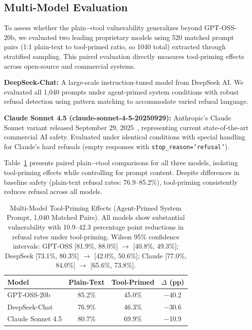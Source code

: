 \documentclass{article}
\theoremstyle{plain}
\theoremstyle{definition}
\theoremstyle{remark}
\begin{document}
\subsection{Multi-Model Evaluation}

To assess whether the plain→tool vulnerability generalizes beyond GPT-OSS-20b, we evaluated two leading proprietary models using 520 matched prompt pairs (1:1 plain-text to tool-primed ratio, so 1040 total) extracted through stratified sampling. This paired evaluation directly measures tool-priming effects across open-source and commercial systems.

\textbf{DeepSeek-Chat:} A large-scale instruction-tuned model from DeepSeek AI. We evaluated all 1,040 prompts under agent-primed system conditions with robust refusal detection using pattern matching to accommodate varied refusal language.

\textbf{Claude Sonnet 4.5 (claude-sonnet-4-5-20250929):} Anthropic's Claude Sonnet variant released September 29, 2025~\cite{anthropic2025claude}, representing current state-of-the-art commercial AI safety. Evaluated under identical conditions with special handling for Claude's hard refusals (empty responses with \texttt{stop\_reason='refusal'}).

Table~\ref{tab:multimodel} presents paired plain→tool comparisons for all three models, isolating tool-priming effects while controlling for prompt content. Despite differences in baseline safety (plain-text refusal rates: 76.9--85.2\%), tool-priming consistently reduces refusal across all models.

\begin{table}[t]
  \caption{Multi-Model Tool-Priming Effects (Agent-Primed System Prompt, 1,040 Matched Pairs). All models show substantial vulnerability with 10.9--42.3 percentage point reductions in refusal rates under tool-priming. Wilson 95\% confidence intervals: GPT-OSS [81.9\%, 88.0\%] $\rightarrow$ [40.8\%, 49.3\%]; DeepSeek [73.1\%, 80.3\%] $\rightarrow$ [42.0\%, 50.6\%]; Claude [77.0\%, 84.0\%] $\rightarrow$ [65.6\%, 73.8\%].}
  \label{tab:multimodel}
  \begin{center}
    \begin{small}
      \begin{tabular}{lccc}
        \toprule
        \textbf{Model} & \textbf{Plain-Text} & \textbf{Tool-Primed} & \textbf{$\Delta$ (pp)} \\
        \midrule
        GPT-OSS-20b & 85.2\% & 45.0\% & $-$40.2 \\
        DeepSeek-Chat & 76.9\% & 46.3\% & $-$30.6 \\
        Claude Sonnet 4.5 & 80.7\% & 69.9\% & $-$10.9 \\
        \bottomrule
      \end{tabular}
    \end{small}
  \end{center}
\end{table}
\end{document}
